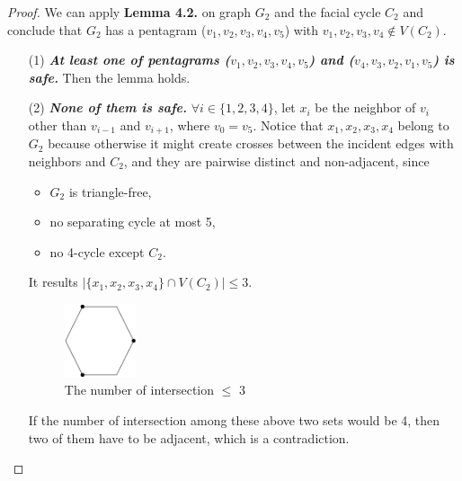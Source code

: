 \begin{proof}
We can apply \textbf{Lemma 4.2.} on graph $G_2$ and the facial cycle $C_2$ and conclude that $G_2$ has a pentagram ($v_1, v_2, v_3, v_4, v_5$) with $v_1, v_2, v_3, v_4 \notin V(C_2)$.
\begin{itemize}
    \item[(1)] \textit{\textbf{At least one of pentagrams ($v_1, v_2, v_3, v_4, v_5$) and ($v_4, v_3, v_2, v_1, v_5$) is safe.}} Then the lemma holds.
    \item[(2)] \textit{\textbf{None of them is safe.}} $\forall i \in \{1, 2, 3, 4\}$, let $x_i$ be the neighbor of $v_i$ other than $v_{i-1}$ and $v_{i+1}$, where $v_0 = v_5$. Notice that $x_1, x_2, x_3, x_4$ belong to $G_2$ because otherwise it might create crosses between the incident edges with neighbors and $C_2$, and they are pairwise distinct and non-adjacent, since 
    \begin{itemize}
        \item $G_2$ is triangle-free,
        \item no separating cycle at most 5,
        \item no 4-cycle except $C_2$.
    \end{itemize}
    It results $|\{x_1, x_2, x_3, x_4\} \cap V(C_2)| \leq 3$.
    \begin{figure}[H] %
    \centering %
    \includegraphics[width=0.2\textwidth]{figure/intersect3vertices.png} 
    \caption{The number of intersection $\leq$ 3} %
    \label{figure} %
    \end{figure}
    If the number of intersection among these above two sets would be 4, then two of them have to be adjacent, which is a contradiction.


\end{itemize}
\end{proof}
